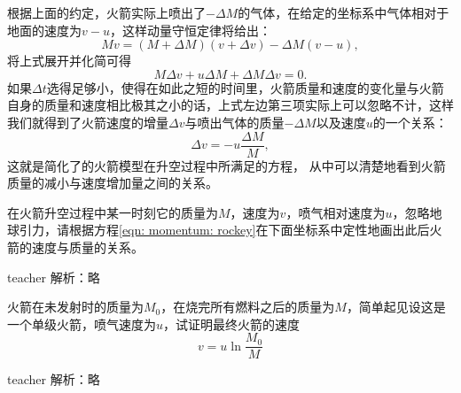根据上面的约定，火箭实际上喷出了$-\Delta M$的气体，在给定的坐标系中气体相对于地面的速度为$v-u$，这样动量守恒定律将给出：
\[
Mv = (M+\Delta M)(v+\Delta v)-\Delta M(v-u),
\]
将上式展开并化简可得
\[
M\Delta v + u\Delta M +\Delta M\Delta v = 0.
\]
如果$\Delta t$选得足够小，使得在如此之短的时间里，火箭质量和速度的变化量与火箭自身的质量和速度相比极其之小的话，上式左边第三项实际上可以忽略不计，这样我们就得到了火箭速度的增量$\Delta v$与喷出气体的质量$-\Delta M$以及速度$u$的一个关系：
\begin{equation}\label{eqn: momentum: rockey}
\Delta v = -u\frac{\Delta M}{M},
\end{equation}
这就是简化了的火箭模型在升空过程中所满足的方程，
从中可以清楚地看到火箭质量的减小与速度增加量之间的关系。

\begin{example}
	在火箭升空过程中某一时刻它的质量为$M$，速度为$v$，喷气相对速度为$u$，忽略地球引力，请根据方程\ref{eqn: momentum: rockey}在下面坐标系中定性地画出此后火箭的速度与质量的关系。
	\begin{taggedblock}{teacher}
	\newline
		解析：略
	\end{taggedblock}
\end{example}

\begin{example}
	火箭在未发射时的质量为$M_0$，在烧完所有燃料之后的质量为$M$，简单起见设这是一个单级火箭，喷气速度为$u$，试证明最终火箭的速度
	\[v = u\ln\frac{M_0}{M}\]
	\begin{taggedblock}{teacher}
		\newline
		解析：略
	\end{taggedblock}
\end{example}














